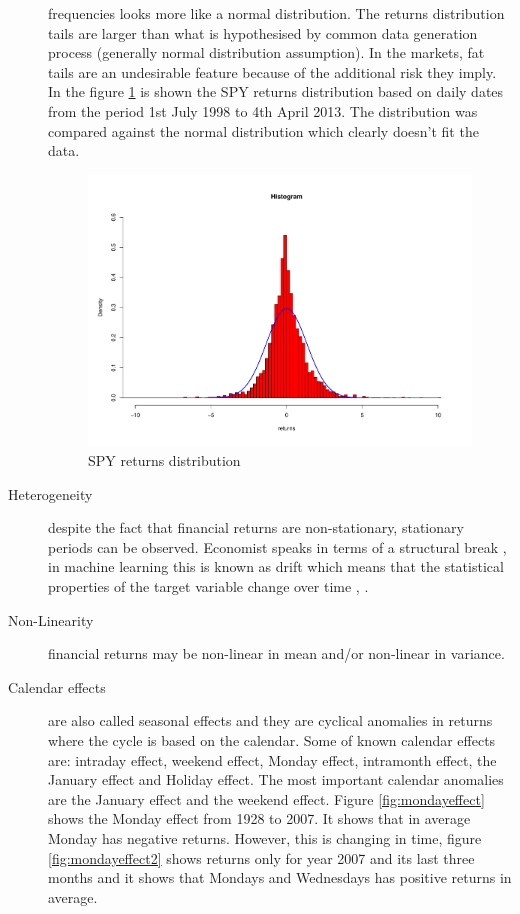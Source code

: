 \begin{description}
frequencies looks more like a normal distribution.
The returns distribution tails are larger than
 what is hypothesised by common data generation process (generally normal
 distribution assumption). In the markets, fat tails are an undesirable feature
 because of the additional risk they imply.  In the figure \ref{fig:returndist}
 is shown the SPY returns distribution based on daily dates from the period 1st
 July 1998 to 4th April 2013. The distribution was compared against the normal
 distribution which clearly doesn't fit the data.  
 \begin{figure}[h]
 \centering
 \includegraphics[scale=0.5]{plots/spy_returns_dist.pdf}
 \caption{SPY returns distribution}
 \label{fig:returndist}
\end{figure}
\item[Heterogeneity] despite the fact that financial returns are non-stationary,
stationary periods can be observed. Economist speaks in terms of a structural
break \cite{stock1994}, in machine learning this is known as drift which means
that the statistical properties of the target variable change over time
\cite{widmer1996}, \cite{tsymbal2004}.
\item[Non-Linearity] financial returns may be non-linear in mean and/or
non-linear in variance.
\item[Calendar effects] are also called seasonal effects and they are cyclical
anomalies in returns where the cycle is based on the calendar. Some of known
calendar effects are: intraday effect, weekend effect, Monday effect, intramonth
effect, the January effect and Holiday effect. The most important calendar
anomalies are the January effect and the weekend effect. Figure
\ref{fig:mondayeffect} shows the Monday effect from 1928 to 2007. It shows that
in average Monday has negative returns. However, this is changing in time,
figure \ref{fig:mondayeffect2} shows returns only for year 2007 and its last
three months and it shows that Mondays and Wednesdays has positive returns in
average.


\end{description}

